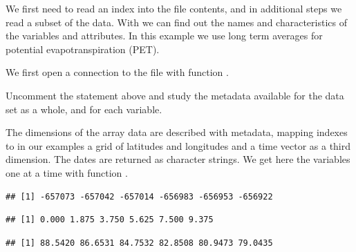 \documentclass[krantz2]{krantz}\usepackage{knitr}%
\begin{document}
We first need to read an index into the file contents, and in additional steps we read a subset of the data. With  we can find out the names and characteristics of the variables and attributes. In this example we use long term averages for potential evapotranspiration (PET).

We first open a connection to the file with function .

\begin{knitrout}\footnotesize
{}\color{fgcolor}\begin{kframe}
\begin{alltt}
 \hlkwb{<-} \hlstd{(}\hlstd{)}
\end{alltt}
\end{kframe}
\end{knitrout}

\begin{playground}
Uncomment the  statement above and study the metadata available for the data set as a whole, and for each variable.
\end{playground}
The dimensions of the array data are described with metadata, mapping indexes to in our examples a grid of latitudes and longitudes and a time vector as a third dimension. The dates are returned as character strings. We get here the variables one at a time with function .

\begin{knitrout}\footnotesize
{}\color{fgcolor}\begin{kframe}
\begin{alltt}
 \hlkwb{<-}  \hlstd{)}
\end{alltt}
\begin{verbatim}
## [1] -657073 -657042 -657014 -656983 -656953 -656922
\end{verbatim}
\begin{alltt}
 \hlkwb{<-}   \hlstd{)}
\end{alltt}
\begin{verbatim}
## [1] 0.000 1.875 3.750 5.625 7.500 9.375
\end{verbatim}
\begin{alltt}
 \hlkwb{<-}  \hlstd{)}
\end{alltt}
\begin{verbatim}
## [1] 88.5420 86.6531 84.7532 82.8508 80.9473 79.0435
\end{verbatim}
\end{kframe}
\end{knitrout}
\end{document}
